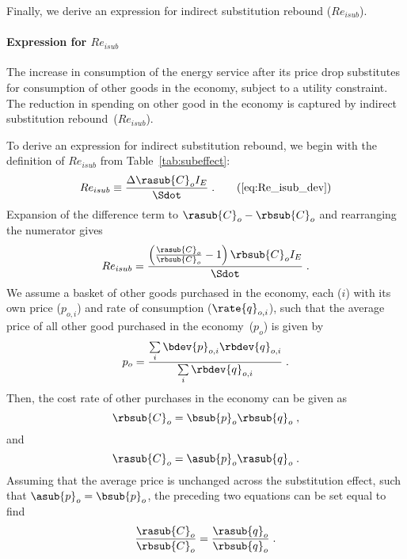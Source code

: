 Finally, we derive an expression for indirect substitution rebound ($Re_{isub}$).


\paragraph{Expression for $Re_{isub}$}
\label{sec:Re_isub}

The increase in consumption of the energy service after its price drop
substitutes for consumption of other goods in the economy,
subject to a utility constraint.
The reduction in spending on other good in the economy
is captured by indirect substitution rebound~($Re_{isub}$).

To derive an expression for indirect substitution rebound,
we begin with the definition of $Re_{isub}$
from Table~\ref{tab:subeffect}:
%
\begin{equation}
  Re_{isub} \equiv \frac{\Delta \rasub{C}_o I_E}{\Sdot} \; .  \tag{\ref{eq:Re_isub_dev}}
\end{equation}
%
Expansion of the difference term to $\rasub{C}_o - \rbsub{C}_o$ and rearranging the numerator gives
%
\begin{equation} \label{eq:Re_isub_prelim}
  Re_{isub} = \frac{\left( \frac{\rasub{C}_o}{\rbsub{C}_o} - 1  \right) \rbsub{C}_o I_E} {\Sdot} \; .
\end{equation}
%
We assume a basket of other goods purchased in the economy,
each ($i$) with its own price ($p_{o,i}$) and rate of consumption ($\rate{q}_{o,i}$),
such that the average price of all other good purchased in the economy~($p_o$) is given by
%
\begin{equation}
  p_o = \frac{\sum\limits_i \bdev{p}_{o,i} \rbdev{q}_{o,i}}{\sum\limits_i \rbdev{q}_{o,i}} \; .
\end{equation}
%
Then, the cost rate of other purchases in the economy can be given as
%
\begin{equation}
  \rbsub{C}_o = \bsub{p}_o \rbsub{q}_o \; ,
\end{equation}
%
and
%
\begin{equation}
  \rasub{C}_o = \asub{p}_o \rasub{q}_o \; .
\end{equation}
%
Assuming that the average price is unchanged across the substitution effect,
such that $\asub{p}_o = \bsub{p}_o$,
the preceding two equations can be set equal to find
%
\begin{equation}
  \frac{\rasub{C}_o}{\rbsub{C}_o} = \frac{\rasub{q}_o}{\rbsub{q}_o} \; .
\end{equation}
